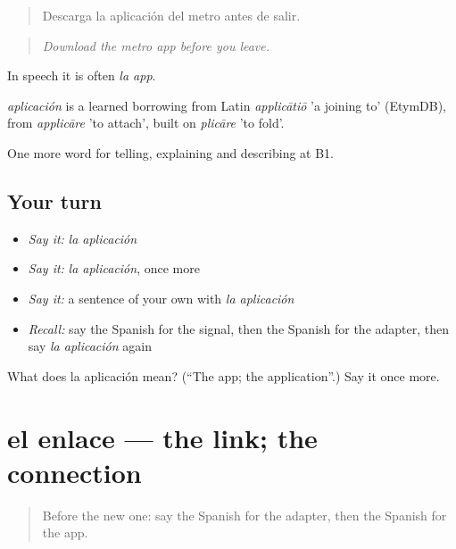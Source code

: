 \begin{quote}
Descarga la aplicación del metro antes de salir.
\end{quote}

\begin{quote}
\emph{Download the metro app before you leave.}
\end{quote}

In speech it is often \emph{la app}.

\begin{cousinweb}
\emph{aplicación} is a learned borrowing from Latin \emph{applicātiō} 'a joining to' (EtymDB), from \emph{applicāre} 'to attach', built on \emph{plicāre} 'to fold'.
\end{cousinweb}

\begin{grammarlens}[title={What you've built}]
One more word for telling, explaining and describing at B1.
\end{grammarlens}

\subsection*{Your turn}
\begin{itemize}
\raggedright
  \item \emph{Say it:} \emph{la aplicación}
  \item \emph{Say it:} \emph{la aplicación}, once more
  \item \emph{Say it:} a sentence of your own with \emph{la aplicación}
  \item \emph{Recall:} say the Spanish for the signal, then the Spanish for the adapter, then say \emph{la aplicación} again
\end{itemize}

\begin{tcolorbox}[breakable,colback=teal!4,colframe=teal!35!black,title={Before you move on}]
What does la aplicación mean? (\textquotedblleft{}The app; the application\textquotedblright{}.) Say it once more.
\end{tcolorbox}
\section[el enlace]{el enlace — the link; the connection}

\label{lesson:ES-C773-enlace}



\begin{quote}
Before the new one: say the Spanish for the adapter, then the Spanish for the app.
\end{quote}

